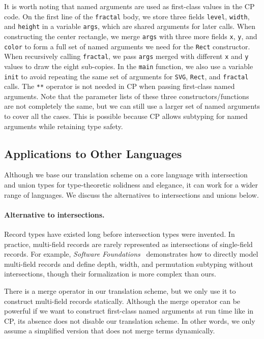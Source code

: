 It is worth noting that named arguments are used as first-class values in the CP
code. On the first line of the \lstinline{fractal} body, we store three fields
\lstinline{level}, \lstinline{width}, and \lstinline{height} in a variable
\lstinline{args}, which are shared arguments for later calls. When constructing
the center rectangle, we merge \lstinline{args} with three more fields
\lstinline{x}, \lstinline{y}, and \lstinline{color} to form a full set of named
arguments we need for the \lstinline{Rect} constructor. When recursively calling
\lstinline{fractal}, we pass \lstinline{args} merged with different
\lstinline{x} and \lstinline{y} values to draw the eight sub-copies. In the
\lstinline{main} function, we also use a variable \lstinline{init} to avoid
repeating the same set of arguments for \lstinline{SVG}, \lstinline{Rect}, and
\lstinline{fractal} calls. The \lstinline{**} operator is not needed in CP when
passing first-class named arguments. Note that the parameter lists of these
three constructors/functions are not completely the same, but we can still use a
larger set of named arguments to cover all the cases. This is possible because
CP allows subtyping for named arguments while retaining type safety.

\subsection{Applications to Other Languages}

Although we base our translation scheme on a core language with intersection and
union types for type-theoretic solidness and elegance, it can work for a wider
range of languages. We discuss the alternatives to intersections and unions
below.

\paragraph{Alternative to intersections.}
Record types have existed long before intersection types were invented. In
practice, multi-field records are rarely represented as intersections of
single-field records. For example, \emph{Software Foundations}~\citep{plf}
demonstrates how to directly model multi-field records and define depth, width,
and permutation subtyping without intersections, though their formalization is
more complex than ours.

There is a merge operator in our translation scheme, but we only use it to
construct multi-field records statically. Although the merge operator can be
powerful if we want to construct first-class named arguments at run time like in
CP, its absence does not disable our translation scheme. In other words, we only
assume a simplified version that does not merge terms dynamically.

